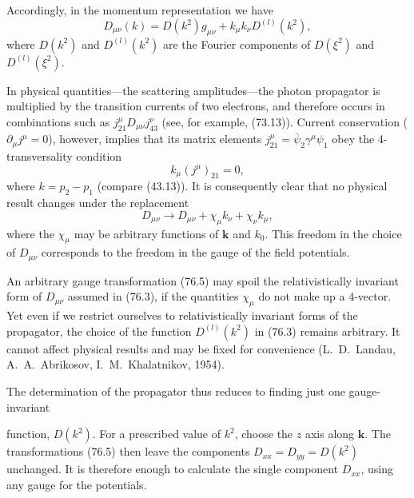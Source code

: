 Accordingly, in the momentum representation we have
\begin{equation}
D_{\mu\nu}(k)=D(k^2)g_{\mu\nu}+k_\mu k_\nu D^{(l)}(k^2),
\tag{76.3}
\label{eq:76.3}
\end{equation}
where $D(k^2)$ and $D^{(l)}(k^2)$ are the Fourier components of $D(\xi^2)$ and $D^{(l)}(\xi^2)$.

In physical quantities---the scattering amplitudes---the photon propagator is multiplied by the transition currents of two electrons, and therefore occurs in combinations such as $j_{21}^{\mu}D_{\mu\nu}j_{43}^{\nu}$ (see, for example, (73.13)). Current conservation ($\partial_\mu j^\mu=0$), however, implies that its matrix elements $j_{21}^{\mu}=\bar\psi_2\gamma^\mu\psi_1$ obey the 4-transversality condition
\begin{equation}
k_\mu(j^\mu)_{21}=0,
\tag{76.4}
\end{equation}
where $k=p_2-p_1$ (compare (43.13)). It is consequently clear that no physical result changes under the replacement
\begin{equation}
D_{\mu\nu}\to D_{\mu\nu}+\chi_\mu k_\nu+\chi_\nu k_\mu,
\tag{76.5}
\end{equation}
where the $\chi_\mu$ may be arbitrary functions of $\mathbf k$ and $k_0$. This freedom in the choice of $D_{\mu\nu}$ corresponds to the freedom in the gauge of the field potentials.

An arbitrary gauge transformation (76.5) may spoil the relativistically invariant form of $D_{\mu\nu}$ assumed in (76.3), if the quantities $\chi_\mu$ do not make up a 4-vector. Yet even if we restrict ourselves to relativistically invariant forms of the propagator, the choice of the function $D^{(l)}(k^2)$ in (76.3) remains arbitrary. It cannot affect physical results and may be fixed for convenience (L.~D.~Landau, A.~A.~Abrikosov, I.~M.~Khalatnikov, 1954).

The determination of the propagator thus reduces to finding just one gauge-invariant

function, $D(k^2)$. For a prescribed value of $k^2$, choose the $z$ axis along $\mathbf k$. The transformations (76.5) then leave the components $D_{xx}=D_{yy}=D(k^2)$ unchanged. It is therefore enough to calculate the single component $D_{xx}$, using any gauge for the potentials.

